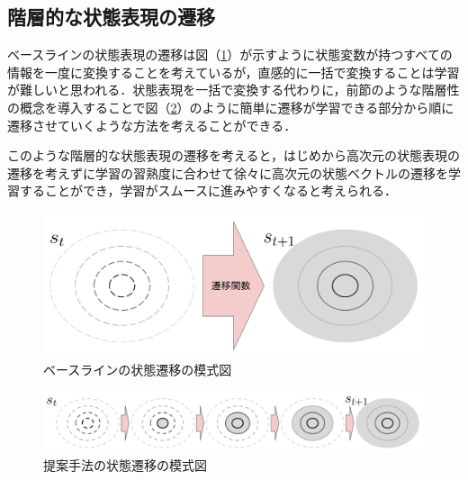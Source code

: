 \subsection{階層的な状態表現の遷移}
ベースラインの状態表現の遷移は図（\ref{fig:transition_base}）が示すように状態変数が持つすべての情報を一度に変換することを考えているが，直感的に一括で変換することは学習が難しいと思われる．状態表現を一括で変換する代わりに，前節のような階層性の概念を導入することで図（\ref{fig:transition_proposal}）のように簡単に遷移が学習できる部分から順に遷移させていくような方法を考えることができる．

このような階層的な状態表現の遷移を考えると，はじめから高次元の状態表現の遷移を考えずに学習の習熟度に合わせて徐々に高次元の状態ベクトルの遷移を学習することができ，学習がスムースに進みやすくなると考えられる．

\begin{figure}[tbp]
  \begin{center}
    \includegraphics[width=0.5\linewidth]{./figures/transition_base.png}
    \caption{ベースラインの状態遷移の模式図}
    \label{fig:transition_base}
  \end{center}
\end{figure}

\begin{figure}[tbp]
  \begin{center}
    \includegraphics[width=0.8\linewidth]{./figures/transition_proposal.png}
    \caption{提案手法の状態遷移の模式図}
    \label{fig:transition_proposal}
  \end{center}
\end{figure}

